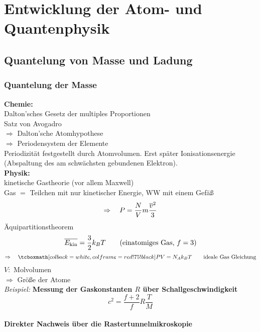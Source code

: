 \chapter{Entwicklung der Atom- und Quantenphysik}

\section{Quantelung von Masse und Ladung}

\subsection{Quantelung der Masse}

\textbf{Chemie:}\\
Dalton'sches Gesetz der multiples Proportionen\\
Satz von Avogadro\\[5pt]
$ \Rightarrow $ Dalton'sche Atomhypothese\\
$ \Rightarrow $ Periodensystem der Elemente\\[5pt]
Periodizität festgestellt durch Atomvolumen. Erst später Ionisationsenergie (Abspaltung des am schwächsten gebundenen Elektron).\\[5pt]
\textbf{Physik:}\\
kinetische Gastheorie (vor allem Maxwell)\\
Gas $ = $ Teilchen mit nur kinetischer Energie, WW mit einem Gefäß
\begin{equation*}
\Rightarrow \quad P = \frac{N}{V} m \frac{\overline{v}^2}{3}
\end{equation*}
Äquipartitionstheorem
\begin{equation*}
\overline{E_{\textrm{kin}}} = \frac{3}{2} k_B T \qquad (\textrm{einatomiges Gas, } f = 3)
\end{equation*}
\begin{equation*}
\Rightarrow \quad \rmbox{P V = N_A k_B T} \qquad \tx{ideale Gas Gleichung}
\end{equation*}
$ V : $ Molvolumen\\
$ \Rightarrow $ Größe der Atome\\[5pt]
\emph{Beispiel:} \textbf{Messung der Gaskonstanten $ R $ über Schallgeschwindigkeit\\}
\begin{equation*}
c^2 = \frac{f + 2}{f} R \frac{T}{M} 
\end{equation*}

\subsubsection{Direkter Nachweis über die Rastertunnelmikroskopie}


